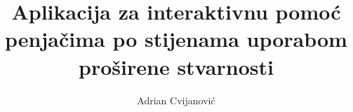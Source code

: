 \documentclass[times, utf8, diplomski, numeric]{fer}
\begin{document}

\title{Aplikacija za interaktivnu pomoć penjačima po stijenama uporabom proširene stvarnosti}

\author{Adrian Cvijanović}


% 

\zahvala{}

\tableofcontents












% 


\end{document}
